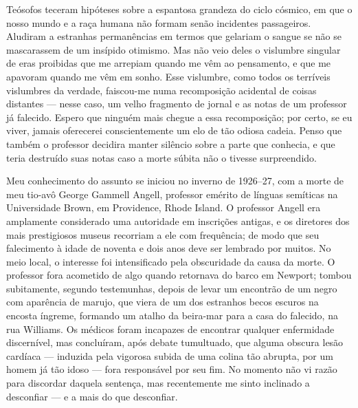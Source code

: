 Teósofos teceram hipóteses sobre a espantosa grandeza do ciclo cósmico,
em que o nosso mundo e a raça humana não formam senão incidentes
passageiros. Aludiram a estranhas permanências em termos que gelariam o
sangue se não se mascarassem de um insípido otimismo. Mas não veio deles
o vislumbre singular de eras proibidas que me arrepiam quando me vêm ao
pensamento, e que me apavoram quando me vêm em sonho. Esse vislumbre,
como todos os terríveis vislumbres da verdade, faiscou-me numa
recomposição acidental de coisas distantes --- nesse caso, um velho
fragmento de jornal e as notas de um professor já falecido. Espero que
ninguém mais chegue a essa recomposição; por certo, se eu viver, jamais
oferecerei conscientemente um elo de tão odiosa cadeia. Penso que também
o professor decidira manter silêncio sobre a parte que conhecia, e que
teria destruído suas notas caso a morte súbita não o tivesse
surpreendido.

Meu conhecimento do assunto se iniciou no inverno de 1926--27, com a
morte de meu tio-avô George Gammell Angell, professor emérito de línguas
semíticas na Universidade Brown, em Providence, Rhode Island. O
professor Angell era amplamente considerado uma autoridade em inscrições
antigas, e os diretores dos mais prestigiosos museus recorriam a ele com
frequência; de modo que seu falecimento à idade de noventa e dois anos
deve ser lembrado por muitos. No meio local, o interesse foi
intensificado pela obscuridade da causa da morte. O professor fora
acometido de algo quando retornava do barco em Newport; tombou
subitamente, segundo testemunhas, depois de levar um encontrão de um
negro com aparência de marujo, que viera de um dos estranhos becos
escuros na encosta íngreme, formando um atalho da beira-mar para a casa
do falecido, na rua Williams. Os médicos foram incapazes de encontrar
qualquer enfermidade discernível, mas concluíram, após debate
tumultuado, que alguma obscura lesão cardíaca --- induzida pela vigorosa
subida de uma colina tão abrupta, por um homem já tão idoso --- fora
responsável por seu fim. No momento não vi razão para discordar daquela
sentença, mas recentemente me sinto inclinado a desconfiar --- e a mais 
do que desconfiar. 



